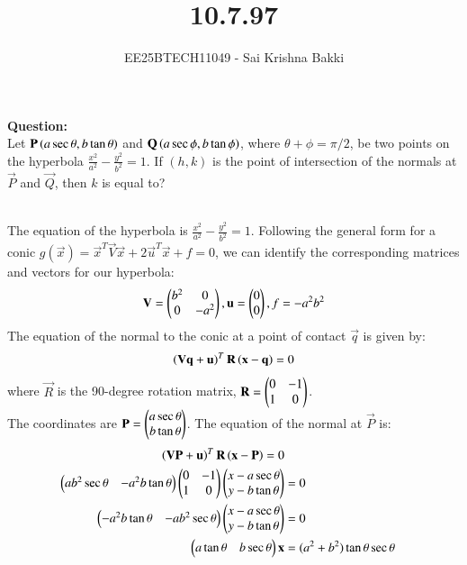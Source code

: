 \documentclass[journal]{IEEEtran}
\begin{document}

\vspace{3cm}

\title{10.7.97}
\author{EE25BTECH11049 - Sai Krishna Bakki}
\maketitle
\vspace{-3em}
\textbf{Question:}\\
Let $\mathbf{P}\left(a \sec \theta, b \tan \theta\right)$ and $\mathbf{Q}\left(a \sec \phi, b \tan \phi\right)$, where $\theta + \phi = \pi/2$, be two points on the hyperbola $\frac{x^2}{a^2} - \frac{y^2}{b^2} = 1$. If $(h, k)$ is the point of intersection of the normals at $\vec{P}$ and $\vec{Q}$, then $k$ is equal to?

\solution\\
The equation of the hyperbola is $\frac{x^2}{a^2} - \frac{y^2}{b^2} = 1$. Following the general form for a conic $g(\vec{x}) = \vec{x}^T \vec{V} \vec{x} + 2\vec{u}^T \vec{x} + f = 0$, we can identify the corresponding matrices and vectors for our hyperbola:
\begin{align}
     \mathbf{V} = \begin{pmatrix}b^2 & 0 \\ 0 & -a^2\end{pmatrix}, 
     \mathbf{u} = \begin{pmatrix}0 \\ 0\end{pmatrix}, 
     f = -a^2b^2
\end{align}
The equation of the normal to the conic at a point of contact $\vec{q}$ is given by:
\begin{align}
 \left(\mathbf{V}\mathbf{q} + \mathbf{u}\right)^T \mathbf{R} \left(\mathbf{x} - \mathbf{q}\right) = 0 
 \end{align}
where $\vec{R}$ is the 90-degree rotation matrix, $\mathbf{R} = \begin{pmatrix}0 & -1 \\ 1 & 0\end{pmatrix}$.\\
The coordinates are $\mathbf{P} = \begin{pmatrix} a \sec \theta \\ b \tan \theta \end{pmatrix}$.
The equation of the normal at $\vec{P}$ is:
\begin{align}
   \left(\mathbf{V}\mathbf{P} + \mathbf{u}\right)^T \mathbf{R} \left(\mathbf{x} - \mathbf{P}\right) = 0 \\
    \begin{pmatrix} ab^2 \sec \theta & -a^2b \tan \theta \end{pmatrix} \begin{pmatrix} 0 & -1 \\ 1 & 0 \end{pmatrix} \begin{pmatrix} x - a \sec \theta \\ y - b \tan \theta \end{pmatrix} &= 0 \\
    \begin{pmatrix} -a^2b \tan \theta & -ab^2 \sec \theta \end{pmatrix} \begin{pmatrix} x - a \sec \theta \\ y - b \tan \theta \end{pmatrix} &= 0\\
    \begin{pmatrix}a\tan\theta&b\sec\theta\end{pmatrix}\mathbf{x}&=(a^2 + b^2) \tan \theta \sec \theta
\end{align}
\end{document}
